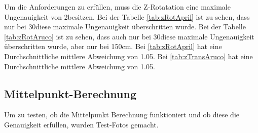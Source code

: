 Um die Anforderungen zu erfüllen, muss die Z-Rotatation eine maximale Ungenauigkeit von 2\degree besitzen.
Bei der Tabelle \ref{tab:zRotApril} ist zu sehen, dass nur bei 30\degree diese maximale Ungenauigkeit überschritten wurde.
Bei der Tabelle \ref{tab:zRotAruco} ist zu sehen, dass auch nur bei 30\degree diese maximale Ungenauigkeit überschritten wurde, aber nur bei 150cm.
Bei \ref{tab:zRotApril} hat eine Durchschnittliche mittlere Abweichung von 1.05\degree. 
Bei \ref{tab:zTransAruco} hat eine Durchschnittliche mittlere Abweichung von 1.05\degree.

\clearpage
\subsection{Mittelpunkt-Berechnung}

Um zu testen, ob die Mittelpunkt Berechnung funktioniert und ob diese die Genauigkeit erfüllen, wurden Test-Fotos gemacht.

